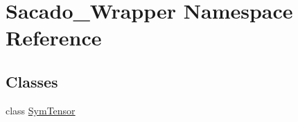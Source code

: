 \hypertarget{namespaceSacado__Wrapper}{}\section{Sacado\+\_\+\+Wrapper Namespace Reference}
\label{namespaceSacado__Wrapper}
\subsection*{Classes}
\begin{DoxyCompactItemize}
\item 
class \hyperlink{classSacado__Wrapper_1_1SymTensor}{Sym\+Tensor}
\end{DoxyCompactItemize}
